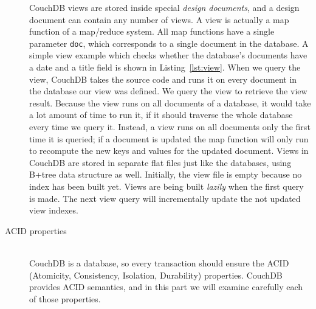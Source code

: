 \begin{description}
    CouchDB views are stored inside special \emph{design documents}, and a design
    document can contain any number of views. A view is actually a map function
    of a map/reduce system. All map functions have a single parameter
    \texttt{doc}, which corresponds to a single document in the database. A simple
    view example which checks whether the database's documents have a date and a
    title field is shown in Listing~\ref{lst:view}. When we query the view,
    CouchDB takes the source code and runs it on every document in the database
    our view was defined. We query the view to retrieve the view result. Because
    the view runs on all documents of a database, it would take a lot amount of
    time to run it, if it should traverse the whole database every time we
    query it. Instead, a view runs on all documents only the first time it is
    queried; if a document is updated the map function will only run to
    recompute the new keys and values for the updated document. Views in CouchDB
    are stored in separate flat files just like the databases, using B+tree data
    structure as well. Initially, the view file is empty because no index has
    been built yet. Views are being built \emph{lazily} when the first query is
    made. The next view query will incrementally update the not updated view
    indexes.


  \item[ACID properties] \hfill \\
    CouchDB is a database, so every transaction should ensure the ACID
    (Atomicity,  Consistency, Isolation, Durability) properties. CouchDB
    provides ACID semantics, and in this part we will examine carefully each of
    those properties.


\end{description}
